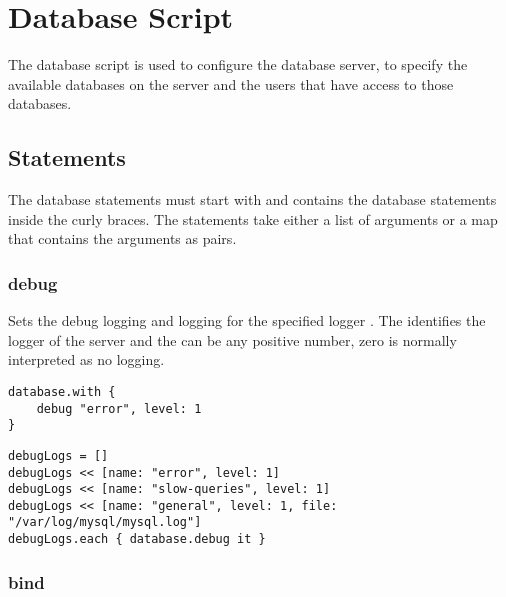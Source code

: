 \section{Database Script}

The database script is used to configure the database server, to specify
the available databases on the server and the users that have access to those
databases.

\subsection[Database Statements]{Statements}

The database statements must start with  and
contains the database statements inside the curly braces.
The statements take either a list of arguments or a map that contains the arguments
as  pairs.

\subsubsection{debug}


Sets the debug logging  and logging  for the specified 
logger . The  identifies the logger of the server and 
the  can be any positive number, zero is normally interpreted as no logging.

\begin{lstlisting}[style=Groovy]
database.with {
    debug "error", level: 1
}
\end{lstlisting}

\begin{lstlisting}[style=Groovy]
debugLogs = []
debugLogs << [name: "error", level: 1]
debugLogs << [name: "slow-queries", level: 1]
debugLogs << [name: "general", level: 1, file: "/var/log/mysql/mysql.log"]
debugLogs.each { database.debug it }
\end{lstlisting}

\subsubsection{bind}


